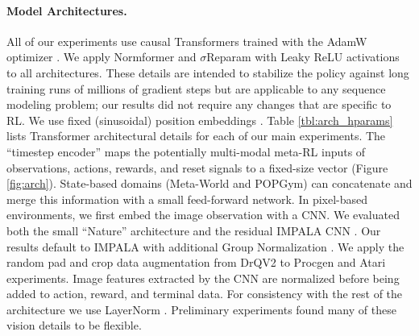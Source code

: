 \paragraph{Model Architectures.} All of our experiments use causal Transformers trained with the AdamW optimizer \cite{loshchilov2017decoupled}. We apply Normformer \cite{shleifer2021normformer} and $\sigma$Reparam \cite{zhai2023stabilizing} with Leaky ReLU activations to all architectures. These details are intended to stabilize the policy against long training runs of millions of gradient steps but are applicable to any sequence modeling problem; our results did not require any changes that are specific to RL. We use fixed (sinusoidal) position embeddings \cite{vaswani2017attention}. Table \ref{tbl:arch_hparams} lists Transformer architectural details for each of our main experiments. The ``timestep encoder'' maps the potentially multi-modal meta-RL inputs of observations, actions, rewards, and reset signals to a fixed-size vector (Figure \ref{fig:arch}). State-based domains (Meta-World and POPGym) can concatenate and merge this information with a small feed-forward network. In pixel-based environments, we first embed the image observation with a CNN. We evaluated both the small ``Nature'' architecture \cite{mnih2015human} and the residual IMPALA CNN \cite{espeholt2018impala}. Our results default to IMPALA with additional Group Normalization \cite{wu2018group, kumar2022offline}. We apply the random pad and crop data augmentation from DrQV2 \cite{yarats2021mastering} to Procgen and Atari experiments. Image features extracted by the CNN are normalized before being added to action, reward, and terminal data. For consistency with the rest of the architecture we use LayerNorm \cite{ba2016layer}. Preliminary experiments found many of these vision details to be flexible.

